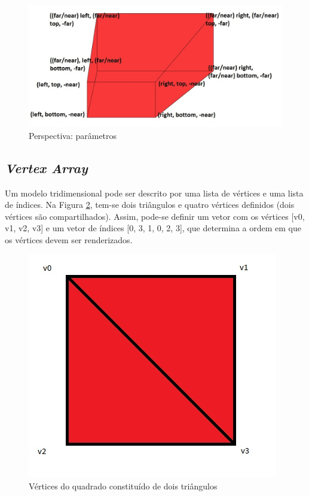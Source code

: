 	\begin{figure}[h]
	\centering
		\includegraphics[keepaspectratio=true,scale=0.55]{figuras/projpers.jpg}
	\caption{Perspectiva: parâmetros}
	\label{projpers}
	\end{figure}

\subsection{\textit{Vertex Array}}

	Um modelo tridimensional pode ser descrito por uma lista de vértices e uma lista de índices. Na Figura \ref{quadrado}, tem-se dois triângulos e quatro vértices definidos (dois vértices são compartilhados). Assim, pode-se definir um vetor com os vértices [v0, v1, v2, v3] e um vetor de índices [0, 3, 1, 0, 2, 3], que determina a ordem em que os vértices devem ser renderizados. 

	\begin{figure}[h]
	\centering
		\includegraphics[keepaspectratio=true,scale=0.5]{figuras/quadrado.jpg}
	\caption{Vértices do quadrado constituído de dois triângulos}
	\label{quadrado}
	\end{figure}


